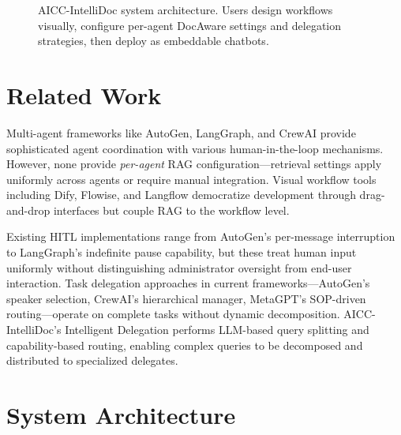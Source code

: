 \documentclass[11pt]{article}
\begin{document}
\begin{figure}[t]
    \centering
    \caption{AICC-IntelliDoc system architecture. Users design workflows visually, configure per-agent DocAware settings and delegation strategies, then deploy as embeddable chatbots.}
    \label{fig:system-overview}
\end{figure}


\section{Related Work}
\label{sec:related}

Multi-agent frameworks like AutoGen, LangGraph, and CrewAI provide sophisticated agent coordination with various human-in-the-loop mechanisms. However, none provide \textit{per-agent} RAG configuration—retrieval settings apply uniformly across agents or require manual integration. Visual workflow tools including Dify, Flowise, and Langflow democratize development through drag-and-drop interfaces but couple RAG to the workflow level.

Existing HITL implementations range from AutoGen's per-message interruption to LangGraph's indefinite pause capability, but these treat human input uniformly without distinguishing administrator oversight from end-user interaction. Task delegation approaches in current frameworks—AutoGen's speaker selection, CrewAI's hierarchical manager, MetaGPT's SOP-driven routing—operate on complete tasks without dynamic decomposition. AICC-IntelliDoc's Intelligent Delegation performs LLM-based query splitting and capability-based routing, enabling complex queries to be decomposed and distributed to specialized delegates.


\section{System Architecture}
\label{sec:architecture}
\end{document}
